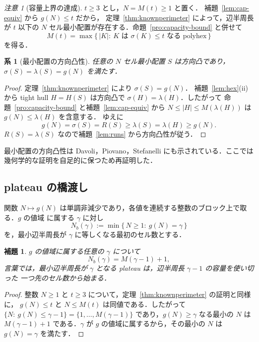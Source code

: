 \documentclass[11pt]{article}
\theoremstyle{plain}
\newtheorem{lemma}[theorem]{補題}
\newtheorem{corollary}[theorem]{系}
\theoremstyle{definition}
\theoremstyle{remark}
\newtheorem{remark}[theorem]{注意}
\begin{document}
\begin{remark}[容量上界の達成]
\(t\ge3\) とし，\(N=M(t)\ge1\) と置く．
補題~\ref{lem:cap-equiv} から \(g(N)\le t\) だから，
定理~\ref{thm:knownperimeter} によって，辺半周長が \(t\) 以下の
\(N\) セル最小配置が存在する．命題~\ref{pro:capacity-bound} と併せて
\[
M(t)=\max\{\,|K|:\ K\text{ は }\sigma(K)\le t
\text{ なる polyhex}\,\}
\]
を得る．
\end{remark}

\begin{corollary}[最小配置の方向凸性]\label{cor:capacity-directional}
任意の \(N\) セル最小配置 \(S\) は方向凸であり，
\(\sigma(S)=\lambda(S)=g(N)\) を満たす．
\end{corollary}
\begin{proof}
定理~\ref{thm:knownperimeter} により \(\sigma(S)=g(N)\)．
補題~\ref{lem:hex}(ii) から tight hull \(H=H(S)\) は方向凸で
\(\sigma(H)=\lambda(H)\)．したがって
命題~\ref{pro:capacity-bound} と補題~\ref{lem:cap-equiv} から
\(N\le|H|\le M(\lambda(H))\) は \(g(N)\le\lambda(H)\) を含意する．
ゆえに
\[
g(N)=\sigma(S)=R(S)\ge\lambda(S)=\lambda(H)\ge g(N).
\]
\(R(S)=\lambda(S)\) なので補題~\ref{lem:runs} から方向凸性が従う．
\end{proof}
最小配置の方向凸性は Davoli，Piovano，Stefanelli
\cite[Definition~3.2 and Proposition~3.3]{DavoliPiovanoStefanelli2017}
にも示されている．ここでは幾何学的な証明を自足的に保つため再証明した．

\subsection{plateau の橋渡し}\label{sec:2.7}

関数 \(N\mapsto g(N)\) は単調非減少であり，各値を連続する整数のブロック上で取る．\(g\) の値域
に属する \(\gamma\) に対し
\[
   N_{b}(\gamma):=\min\{\,N\ge1:\ g(N)=\gamma\,\}
\]
を，最小辺半周長が \(\gamma\) に等しくなる最初のセル数とする．

\begin{lemma}\label{lem:bridge}
\(g\) の値域に属する任意の \(\gamma\) について
\begin{equation}\label{eq:bridge}
   N_{b}(\gamma)=M(\gamma-1)+1 ,
\end{equation}
言葉では，最小辺半周長が \(\gamma\) となる plateau は，辺半周長 \(\gamma-1\) の容量を使い切った
一つ先のセル数から始まる．
\end{lemma}

\begin{proof}
整数 \(N\ge1\) と \(t\ge3\) について，定理~\ref{thm:knownperimeter} の証明と同様に，
\(g(N)\le t\) と \(N\le M(t)\) は同値である．したがって
\(\{N:\ g(N)\le\gamma-1\}=\{1,\dots,M(\gamma-1)\}\) であり，\(g(N)\ge\gamma\) なる最小の \(N\)
は \(M(\gamma-1)+1\) である．\(\gamma\) が \(g\) の値域に属するから，その最小の \(N\) は
\(g(N)=\gamma\) を満たす．
\end{proof}
\end{document}
